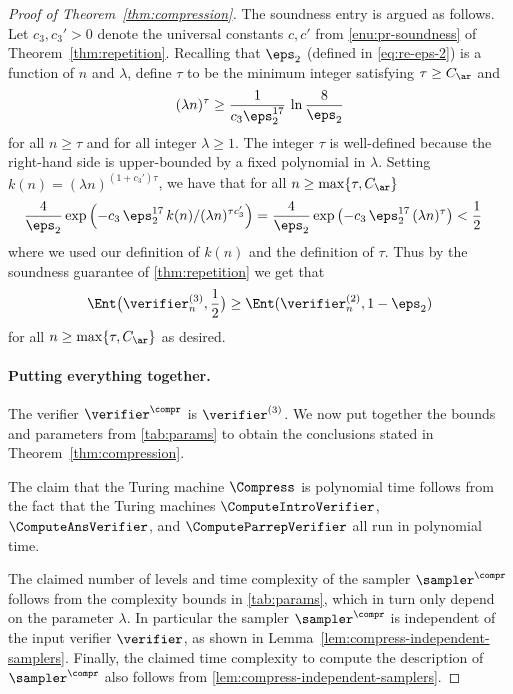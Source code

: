 \begin{proof}[Proof of Theorem~\ref{thm:compression}]
  The soundness entry is argued as follows. Let $c_3,c_3' > 0$ denote the universal constants $c,c'$ from  \cref{enu:pr-soundness} of Theorem~\ref{thm:repetition}. Recalling that $\eps_2$ (defined in \cref{eq:re-eps-2}) is a function of $n$ and $\lambda$, define $\tau$ to be the minimum integer satisfying $\tau \geq C_\ar$ and
\begin{equation}
\label{eq:c_rep}
  		(\lambda n)^{\tau} \geq \frac{1}{c_3 \eps_2^{17}} \, \ln \frac{8}{\eps_2}
\end{equation}
for all $n \geq \tau$ and for all integer $\lambda \geq 1$. The integer $\tau$ is well-defined because the right-hand side is upper-bounded by a fixed polynomial in $\lambda$. Setting $k(n) = (\lambda n)^{(1 + c_3')\tau}$, we have that for all $n \geq \max \{ \tau, C_\ar \}$
  \begin{align*}
  		\frac{4}{\eps_2} \exp \left ( - c_3 \, \eps_2^{17} \, k(n)/(\lambda n)^{\tau c_3'} \right) &= \frac{4}{\eps_2} \exp \left ( - c_3 \, \eps_2^{17} \, (\lambda n)^{\tau} \right) < \frac{1}{2}
  \end{align*}
  where we used our definition of $k(n)$ and the definition of $\tau$. 
Thus by the soundness guarantee of \cref{thm:repetition} we get that
  \[
  	\Ent \big(
    \verifier_n^{(3)}, \frac{1}{2} \big) \geq \Ent(\verifier_n^{(2)}, 1 - \eps_2)
  \]
  for all $n \geq \max \{ \tau, C_\ar \}$ as desired.  
  


  \paragraph{Putting everything together.}
  The verifier $\verifier^\compr$ is $\verifier^{(3)}$.
  We now put together the bounds and parameters from \cref{tab:params} to obtain
  the conclusions stated in Theorem~\ref{thm:compression}.

The claim that the Turing machine $\Compress$ is polynomial time follows from
  the fact that the Turing machines $\ComputeIntroVerifier$, $\ComputeAnsVerifier$, and $\ComputeParrepVerifier$ all run in polynomial time.

The claimed number of levels and time complexity of the sampler
  $\sampler^\compr$ follows from the complexity bounds in \cref{tab:params},
  which in turn only depend on the parameter $\lambda$.
In particular the sampler $\sampler^\compr$ is {independent} of the input
  verifier $\verifier$, as shown in
  Lemma~\ref{lem:compress-independent-samplers}.
  Finally, the claimed time complexity to compute the description of
  $\sampler^\compr$ also follows from \cref{lem:compress-independent-samplers}.


\end{proof}
